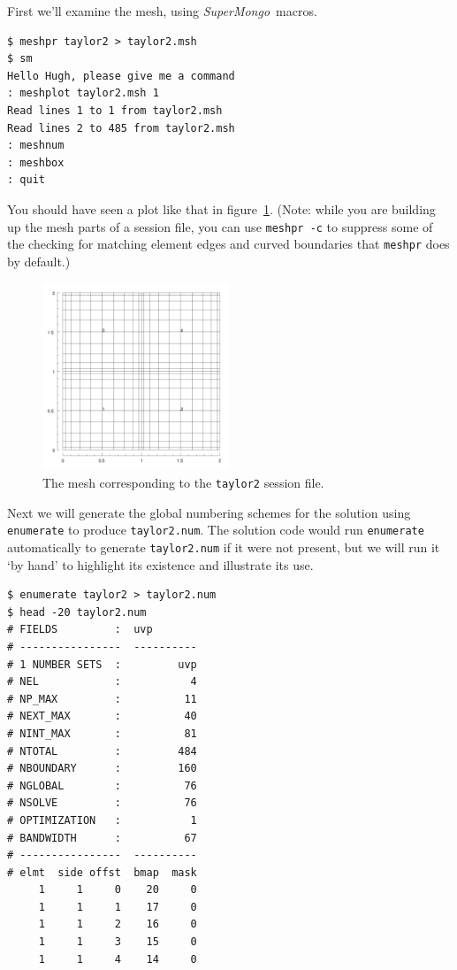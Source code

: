 \documentclass[11pt]{report}
\newcommand{\SM}{\emph{SuperMongo}}
\begin{document}
First we'll examine the mesh, using \SM\ macros.
{\small
\begin{verbatim}
$ meshpr taylor2 > taylor2.msh
$ sm
Hello Hugh, please give me a command
: meshplot taylor2.msh 1
Read lines 1 to 1 from taylor2.msh
Read lines 2 to 485 from taylor2.msh
: meshnum
: meshbox
: quit
\end{verbatim}
}
\noindent
You should have seen a plot like that in figure~\ref{tay2msh}. (Note:
while you are building up the mesh parts of a session file, you can
use \texttt{meshpr -c} to suppress some of the checking for matching
element edges and curved boundaries that \texttt{meshpr} does by
default.)
\begin{figure}
\begin{center}
\includegraphics[width=0.5\textwidth]{taylor2mesh}
\end{center}
\caption{
\label{tay2msh}
  The mesh corresponding to the \texttt{taylor2} session file.
}
\end{figure}

Next we will generate the global numbering schemes for the solution
using \texttt{enumerate} to produce \texttt{taylor2.num}.  The
solution code would run \texttt{enumerate} automatically to generate
\texttt{taylor2.num} if it were not present, but we will run it `by
hand' to highlight its existence and illustrate its use.
{\small
\begin{verbatim}
$ enumerate taylor2 > taylor2.num
$ head -20 taylor2.num
# FIELDS         :  uvp
# ----------------  ----------
# 1 NUMBER SETS  :         uvp
# NEL            :           4
# NP_MAX         :          11
# NEXT_MAX       :          40
# NINT_MAX       :          81
# NTOTAL         :         484
# NBOUNDARY      :         160
# NGLOBAL        :          76
# NSOLVE         :          76
# OPTIMIZATION   :           1
# BANDWIDTH      :          67
# ----------------  ----------
# elmt  side offst  bmap  mask
     1     1     0    20     0
     1     1     1    17     0
     1     1     2    16     0
     1     1     3    15     0
     1     1     4    14     0
\end{verbatim}
}
\end{document}
